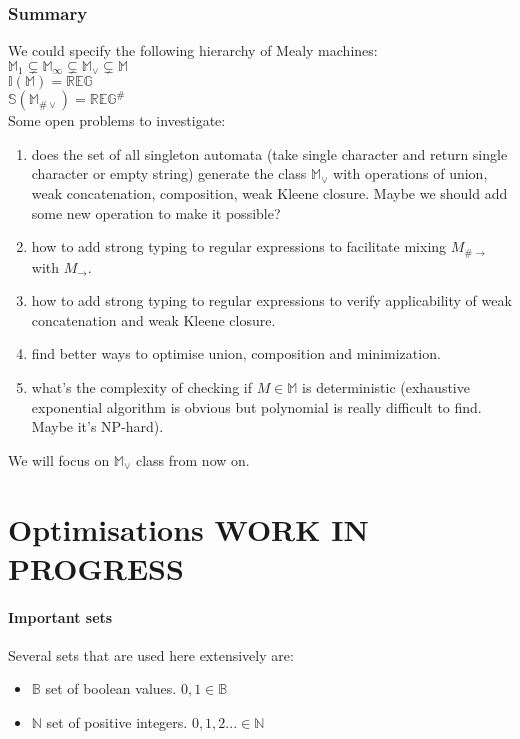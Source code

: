 \documentclass[12pt]{article}
\begin{document}
\section{Summary} We could specify the following hierarchy of Mealy machines: \\
$\mathbb{M}_1 \subsetneq \mathbb{M}_\infty \subsetneq \mathbb{M}_\vee \subsetneq \mathbb{M}$ \\
$\mathbb{I}(\mathbb{M}) = \mathbb{REG}$ \\
$\mathbb{S}(\mathbb{M}_{\#\vee}) = \mathbb{REG}^\#$ \\
Some open problems to investigate: 
\begin{enumerate}
	\item does the set of all singleton automata  (take single character and return single character or empty string) generate the class $\mathbb{ M}_\vee$ with operations of union, weak concatenation, composition, weak Kleene closure. Maybe  we should add some new operation to make it possible?
	\item how to add strong typing to regular expressions to facilitate mixing $M_{\#\rightarrow}$ with $M_{\rightarrow}$.
	\item how to add strong typing to regular expressions to verify applicability of weak concatenation and weak Kleene closure.
	\item find better ways to optimise union, composition and minimization.
	\item what's the complexity of checking if $M\in\mathbb{ M}$ is deterministic (exhaustive exponential algorithm is obvious but polynomial is really difficult to find. Maybe it's NP-hard).
\end{enumerate}
We will focus on $\mathbb{M}_\vee$ class from now on.
\part{Optimisations WORK IN PROGRESS}
\subsection{Important sets}
Several sets that are used here extensively are:
\begin{itemize}
	\item $\mathbb{ B}$ set of boolean values. $0,1 \in\mathbb{ B}$ 
	\item $\mathbb{ N}$ set of positive integers. $0,1,2... \in\mathbb{ N}$ 
\end{itemize}
\end{document}
